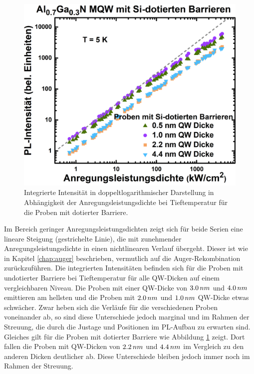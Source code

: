 \begin{figure}[H]
\begin{minipage}[t]{0.49\textwidth}
    \includegraphics[width=\linewidth]{Bilder/MQWdickenSerie/intTTdotierte.png}
		\caption{Integrierte Intensität in doppeltlogarithmischer Darstellung in Abhängigkeit der Anregungsleistungsdichte bei Tieftemperatur für die Proben mit dotierter Barriere.}
    \label{fig:dotiertint}
  \end{minipage}
\end{figure}
\noindent 
Im Bereich geringer Anregungsleistungsdichten zeigt sich für beide Serien eine lineare Steigung (gestrichelte Linie), die mit zunehmender Anregungsleistungsdichte in einen nichtlinearen Verlauf übergeht. Dieser ist wie in Kapitel \ref{chap:auger} beschrieben, vermutlich auf die Auger-Rekombination zurückzuführen.
Die integrierten Intensitäten befinden sich für die Proben mit undotierter Barriere bei Tieftemperatur für alle QW-Dicken auf einem vergleichbaren Niveau.
\newline
Die Proben mit einer QW-Dicke von $3.0 \thinspace nm$ und $4.0 \thinspace nm$ emittieren am hellsten und die Proben mit $2.0 \thinspace nm$ und $1.0 \thinspace nm$ QW-Dicke etwas schwächer. 
Zwar heben sich die Verläufe für die verschiedenen Proben voneinander ab, so sind diese Unterschiede jedoch marginal und im Rahmen der Streuung, die durch die Justage und Positionen im PL-Aufbau zu erwarten sind. Gleiches gilt für die Proben mit dotierter Barriere wie Abbildung \ref{fig:dotiertint} zeigt. 
Dort fallen die Proben mit QW-Dicken von $2.2 \thinspace nm$ und $4.4 \thinspace nm$ im Vergleich zu den anderen Dicken deutlicher ab. Diese Unterschiede bleiben jedoch immer noch im Rahmen der Streuung.  

